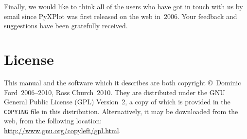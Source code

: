 Finally, we would like to think all of the users who have got in touch with us
by email since PyXPlot was first released on the web in~2006. Your feedback and
suggestions have been gratefully received.

\section{License}

This manual and the software which it describes are both copyright \copyright\
Dominic Ford~2006--2010, Ross Church~2010. They are distributed under the GNU
General Public License (GPL) Version~2, a copy of which is provided in the {\tt
COPYING} file in this distribution. Alternatively, it may be downloaded from the web, from
the following location:\\ \url{http://www.gnu.org/copyleft/gpl.html}.

